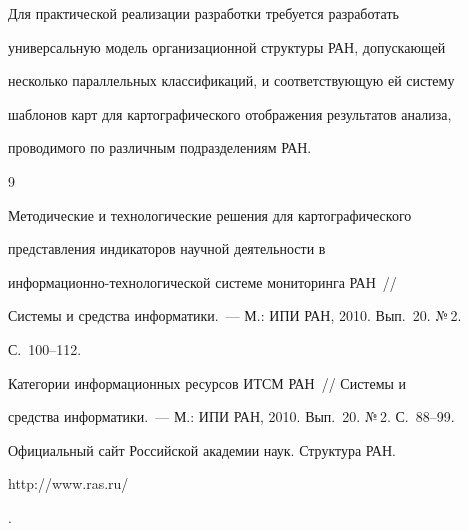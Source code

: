      


     Для практической реализации разработки требуется разработать 


универсальную модель организационной структуры РАН, допускающей 


несколько параллельных классификаций, и соответствующую ей систему 


шаблонов карт для картографического отображения результатов анализа, 


проводимого по различным подразделениям РАН.


     


     {\small\frenchspacing


{%




\begin{thebibliography}{9}









      Методические и технологические решения для картографического 


представления индикаторов научной деятельности в 


      информационно-технологической системе мониторинга РАН~/\!\!/ 


Системы и средства информатики.~--- М.: ИПИ РАН, 2010.   Вып.~20. №\,2.


С.~100--112.


      






      Категории информационных ресурсов ИТСМ РАН~/\!\!/ Системы и 


средства информатики.~--- М.: ИПИ РАН, 2010.  Вып.~20. №\,2. С.~88--99.


      




      Официальный сайт Российской академии наук. Структура РАН. {\sf 


http://www.ras.ru/}.


      





\end{thebibliography}}}
